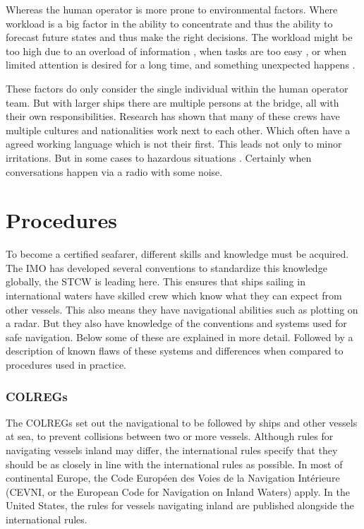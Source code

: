 Whereas the human operator is more prone to environmental factors. Where workload is a big factor in the ability to concentrate and thus the ability to forecast future states and thus make the right decisions. The workload might be too high due to an overload of information \cite{Speier1999}, when tasks are too easy \cite{Washburn2001}, or when limited attention is desired for a long time, and something unexpected happens \cite{McMorris2018}.

These factors do only consider the single individual within the human operator team. But with larger ships there are multiple persons at the bridge, all with their own responsibilities. Research has shown that many of these crews have multiple cultures and nationalities work next to each other. Which often have a agreed working language which is not their first. This leads not only to minor irritations. But in some cases to hazardous situations \cite{Hetherington2006}. Certainly when conversations happen via a radio with some noise. 

\section{Procedures}
To become a certified seafarer, different skills and knowledge must be acquired. The \ac{IMO} has developed several conventions to standardize this knowledge globally, the \ac{STCW} is leading here. This ensures that ships sailing in international waters have skilled crew which know what they can expect from other vessels. This also means they have navigational abilities such as plotting on a radar. But they also have knowledge of the conventions and systems used for safe navigation. Below some of these are explained in more detail. Followed by a description of known flaws of these systems and differences when compared to procedures used in practice.

\subsubsection{\acf{COLREGs}}
The \ac{COLREGs} set out the navigational to be followed by ships and other vessels at sea, to prevent collisions between two or more vessels. Although rules for navigating vessels inland may differ, the international rules specify that they should be as closely in line with the international rules as possible. In most of continental Europe, the Code Européen des Voies de la Navigation Intérieure (CEVNI, or the European Code for Navigation on Inland Waters) apply. In the United States, the rules for vessels navigating inland are published alongside the international rules.

